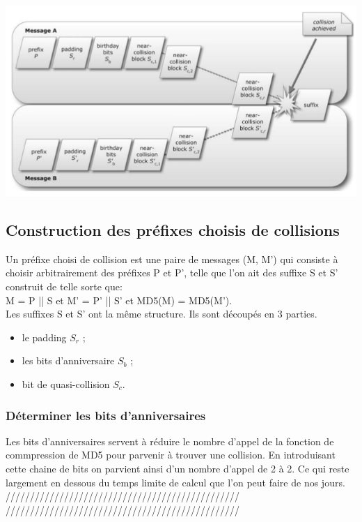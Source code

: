 \documentclass[a4paper,11pt,french]{article}
\begin{document}
\includegraphics[scale=.61]{col.png}


\subsection{Construction des préfixes choisis de collisions}
Un préfixe choisi de collision est une paire de messages (M, M') qui consiste à choisir arbitrairement des préfixes P et P', telle que l'on ait des suffixe S et S' construit de telle sorte que:\\
M = P || S et M' = P' || S' et MD5(M) = MD5(M').\\

Les suffixes S et S' ont la même structure. Ils sont découpés en 3 parties.
\begin{itemize}
\item le padding $S_{r}$ ;
\item les bits d'anniversaire $S_{b}$ ;
\item bit de quasi-collision $S_{c}$.
\end{itemize}
\vspace{.5cm}

\subsubsection{Déterminer les bits d'anniversaires}
Les bits d'anniversaires servent à réduire le nombre d'appel de la fonction de commpression de MD5 pour parvenir à trouver une collision. En introduisant cette chaine de bits on parvient ainsi d'un nombre d'appel de 2 à 2. Ce qui reste largement en dessous du temps limite de calcul que l'on peut faire de nos jours.\\

////////////////////////////////////////////////\\
////////////////////////////////////////////////\\
\end{document}
